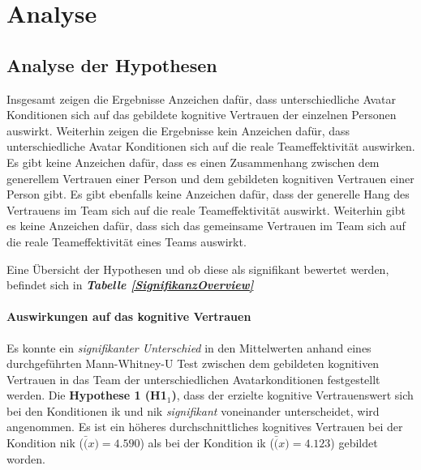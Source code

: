 \documentclass[a4paper,11pt]{article}%
\renewcommand{\\}{\vspace*{0.5\baselineskip} \newline}
\begin{document}

\clearpage
\newpage
\section{Analyse}
\subsection{Analyse der Hypothesen}
Insgesamt zeigen die Ergebnisse Anzeichen dafür, dass unterschiedliche Avatar Konditionen sich auf das gebildete kognitive Vertrauen der einzelnen Personen auswirkt. 
Weiterhin zeigen die Ergebnisse kein Anzeichen dafür, dass unterschiedliche Avatar Konditionen sich auf die reale Teameffektivität auswirken. Es gibt keine Anzeichen dafür, dass es einen Zusammenhang zwischen dem generellem Vertrauen einer Person und dem gebildeten kognitiven Vertrauen einer Person gibt. Es gibt ebenfalls keine Anzeichen dafür, dass der generelle Hang des Vertrauens im Team sich auf die reale Teameffektivität auswirkt. Weiterhin gibt es keine Anzeichen dafür, dass sich das gemeinsame Vertrauen im Team sich auf die reale Teameffektivität eines Teams auswirkt.

Eine Übersicht der Hypothesen und ob diese als signifikant bewertet werden, befindet sich in \textbf{\textit{Tabelle \ref{SignifikanzOverview}}}

\paragraph{Auswirkungen auf das kognitive Vertrauen}
Es konnte ein \textit{signifikanter Unterschied} in den Mittelwerten anhand eines durchgeführten Mann-Whitney-U Test zwischen dem gebildeten kognitiven Vertrauen in das Team der unterschiedlichen Avatarkonditionen festgestellt werden. Die \textbf{Hypothese 1 (H1$_{1}$)}, dass der erzielte kognitive Vertrauenswert sich bei den Konditionen \ac{ik} und \ac{nik}  \textit{signifikant} voneinander unterscheidet, wird angenommen. Es ist ein höheres durchschnittliches kognitives Vertrauen bei der Kondition \ac{nik} ($\bar(x)=4.590$) als bei der Kondition \ac{ik} ($\bar(x)= 4.123$) gebildet worden.
\end{document}
